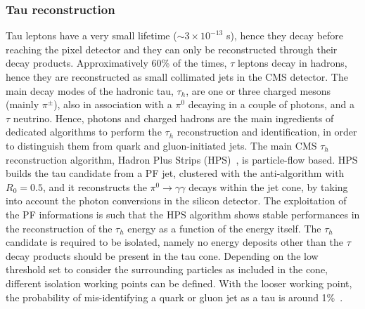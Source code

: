 
\subsubsection{Tau reconstruction}
\noindent Tau leptons have a very small lifetime ($\sim 3 \times 10^{-13}$ s), hence they decay before reaching the pixel detector and they can only be reconstructed through their decay products. Approximatively 60\% of the times, $\tau$ leptons decay in hadrons, hence they are reconstructed as small collimated jets in the CMS detector. The main decay modes of the hadronic tau, $\tau_h$, are one or three charged mesons (mainly $\pi^{\pm}$), also in association with a $\pi^0$ decaying in a couple of photons, and a $\tau$ neutrino. Hence, photons and charged hadrons are the main ingredients of dedicated algorithms to perform the $\tau_h$ reconstruction and identification, in order to distinguish them from quark and gluon-initiated jets. The main CMS $\tau_h$ reconstruction algorithm, Hadron Plus Strips (HPS)~\cite{Chatrchyan:2012zz}, is particle-flow based. HPS builds the tau candidate from a PF jet, clustered with the anti-\kt algorithm with $R_0 = 0.5$, and it reconstructs the $\pi^0 \rightarrow \gamma \gamma$ decays within the jet cone, by taking into account the photon conversions in the silicon detector. The exploitation of the PF informations is such that the HPS algorithm shows stable performances in the reconstruction of the $\tau_h$ energy as a function of the energy itself. The $\tau_h$ candidate is required to be isolated, namely no energy deposits other than the $\tau$ decay products should be present in the tau cone. Depending on the low threshold set to consider the surrounding particles as included in the cone, different isolation working points can be defined. With the looser working point, the probability of mis-identifying a quark or gluon jet as a tau is around 1\%~\cite{Chatrchyan:2012zz}.

